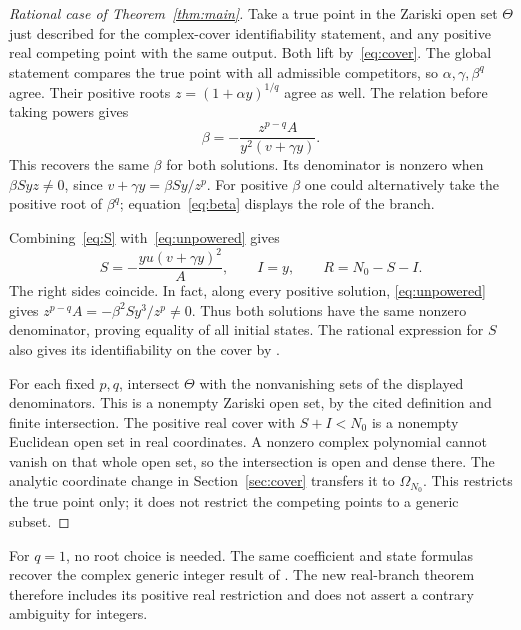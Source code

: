 \documentclass[10pt,a4paper]{article}
\theoremstyle{definition}\newtheorem{definition}[theorem]{Definition}
\begin{document}
\begin{proof}[Rational case of Theorem~\ref{thm:main}]
Take a true point in the Zariski open set $\Theta$ just described for the complex-cover
identifiability statement, and any positive real competing point with
the same output. Both lift by~\eqref{eq:cover}. The global statement
compares the true point with all admissible competitors, so
$\alpha,\gamma,\beta^q$ agree. Their positive roots
$z=(1+\alpha y)^{1/q}$ agree as well. The relation before taking
powers gives
\begin{equation}
\beta=-\frac{z^{p-q}A}{y^2(v+\gamma y)}.
\label{eq:beta}
\end{equation}
This recovers the same $\beta$ for both solutions. Its denominator is
nonzero when $\beta Sy z\ne0$, since $v+\gamma y=\beta Sy/z^p$.
For positive $\beta$ one could alternatively take the positive root
of $\beta^q$; equation~\eqref{eq:beta} displays the role of the branch.

Combining~\eqref{eq:S} with~\eqref{eq:unpowered} gives
\begin{equation}
S=-\frac{yu(v+\gamma y)^2}{A},\qquad I=y,\qquad R=N_0-S-I.
\label{eq:states}
\end{equation}
The right sides coincide. In fact, along every positive solution,
\eqref{eq:unpowered} gives
$z^{p-q}A=-\beta^2Sy^3/z^p\ne0$. Thus both solutions have the same
nonzero denominator, proving equality of all initial states.
The rational expression for $S$ also gives its identifiability on the
cover by \cite[Proposition~3.1]{OPT}.

For each fixed $p,q$, intersect $\Theta$ with the
nonvanishing sets of the displayed denominators. This is a nonempty
Zariski open set, by the cited definition and finite intersection.
The positive real cover with $S+I<N_0$ is a nonempty
Euclidean open set in real coordinates. A nonzero complex polynomial
cannot vanish on that whole open set, so the intersection is open and
dense there. The analytic coordinate change in
Section~\ref{sec:cover} transfers it to $\Omega_{N_0}$. This restricts
the true point only; it does not restrict the competing points to a
generic subset.
\end{proof}

For $q=1$, no root choice is needed. The same coefficient and state
formulas recover the complex generic integer result of \cite{V1}.
The new real-branch theorem therefore includes its positive real
restriction and does not assert a contrary ambiguity for integers.
\end{document}

